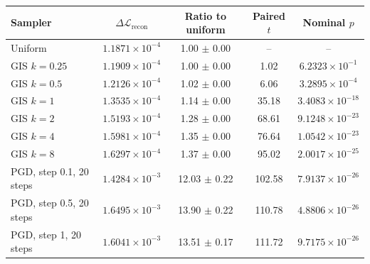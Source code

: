 \begin{tabular}{lcccc}
\toprule
Sampler & $\Delta\mathcal{L}_{\mathrm{recon}}$ & Ratio to uniform & Paired $t$ & Nominal $p$ \\
\midrule
Uniform & $1.1871 \times 10^{-4}$ & 1.00 $\pm$ 0.00 & -- & -- \\
GIS $k=0.25$ & $1.1909 \times 10^{-4}$ & 1.00 $\pm$ 0.00 & 1.02 & $6.2323 \times 10^{-1}$ \\
GIS $k=0.5$ & $1.2126 \times 10^{-4}$ & 1.02 $\pm$ 0.00 & 6.06 & $3.2895 \times 10^{-4}$ \\
GIS $k=1$ & $1.3535 \times 10^{-4}$ & 1.14 $\pm$ 0.00 & 35.18 & $3.4083 \times 10^{-18}$ \\
GIS $k=2$ & $1.5193 \times 10^{-4}$ & 1.28 $\pm$ 0.00 & 68.61 & $9.1248 \times 10^{-23}$ \\
GIS $k=4$ & $1.5981 \times 10^{-4}$ & 1.35 $\pm$ 0.00 & 76.64 & $1.0542 \times 10^{-23}$ \\
GIS $k=8$ & $1.6297 \times 10^{-4}$ & 1.37 $\pm$ 0.00 & 95.02 & $2.0017 \times 10^{-25}$ \\
PGD, step 0.1, 20 steps & $1.4284 \times 10^{-3}$ & 12.03 $\pm$ 0.22 & 102.58 & $7.9137 \times 10^{-26}$ \\
PGD, step 0.5, 20 steps & $1.6495 \times 10^{-3}$ & 13.90 $\pm$ 0.22 & 110.78 & $4.8806 \times 10^{-26}$ \\
PGD, step 1, 20 steps & $1.6041 \times 10^{-3}$ & 13.51 $\pm$ 0.17 & 111.72 & $9.7175 \times 10^{-26}$ \\
\bottomrule
\end{tabular}